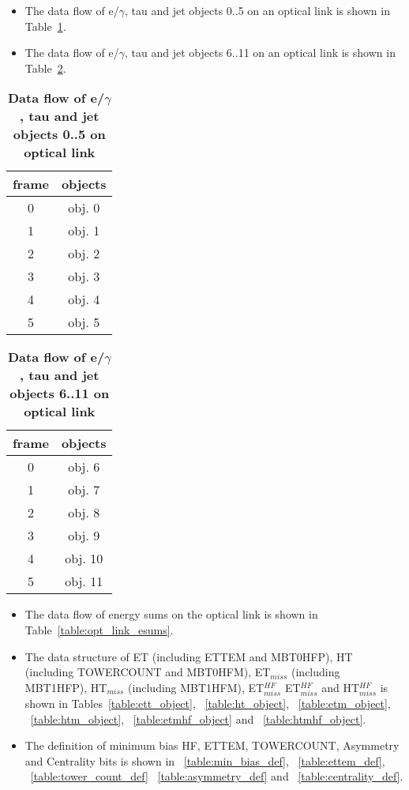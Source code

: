\documentclass{cmspaper}
\begin{document}
\clearpage

\begin{itemize}
\item The data flow of e/$\gamma$, tau and jet objects 0..5 on an optical link is shown in Table~\ref{table:opt_link_egamma_obj_0_5}.
\item The data flow of e/$\gamma$, tau and jet objects 6..11 on an optical link is shown in Table~\ref{table:opt_link_egamma_obj_6_11}.
\end{itemize}

\begin{table}[ht]
\caption{\bf Data flow of e/$\gamma$, tau and jet objects 0..5 on optical link}
\vspace{5mm}
\centering
\begin{tabular}{|c|c|}\hline
frame & objects\\\hline\hline
0 & obj. 0 \\\hline
1 & obj. 1 \\\hline
2 & obj. 2 \\\hline
3 & obj. 3 \\\hline
4 & obj. 4 \\\hline
5 & obj. 5 \\\hline
\end{tabular}
\label{table:opt_link_egamma_obj_0_5}
\end{table}

\begin{table}[ht]
\caption{\bf Data flow of e/$\gamma$, tau and jet objects 6..11 on optical link}
\vspace{5mm}
\centering
\begin{tabular}{|c|c|}\hline
frame & objects\\\hline\hline
0 & obj. 6 \\\hline
1 & obj. 7 \\\hline
2 & obj. 8 \\\hline
3 & obj. 9 \\\hline
4 & obj. 10 \\\hline
5 & obj. 11 \\\hline
\end{tabular}
\label{table:opt_link_egamma_obj_6_11}
\end{table}

\clearpage

\begin{itemize}
\item The data flow of energy sums on the optical link is shown in Table~\ref{table:opt_link_esums}.
\item The data structure of ET (including ETTEM and MBT0HFP), HT (including TOWERCOUNT and MBT0HFM), ET$_{miss}$ (including MBT1HFP), HT$_{miss}$ (including MBT1HFM), ET$_{miss}^{HF}$    ET$_{miss}^{HF}$
and HT$_{miss}^{HF}$
is shown in Tables~\ref{table:ett_object}, ~\ref{table:ht_object}, ~\ref{table:etm_object}, ~\ref{table:htm_object}, ~\ref{table:etmhf_object} and ~\ref{table:htmhf_object}.
\item The definition of minimum bias HF, ETTEM, TOWERCOUNT, Asymmetry and Centrality bits is shown in ~\ref{table:min_bias_def}, ~\ref{table:ettem_def}, ~\ref{table:tower_count_def}
~\ref{table:asymmetry_def} and ~\ref{table:centrality_def}.
\end{itemize}
\end{document}
